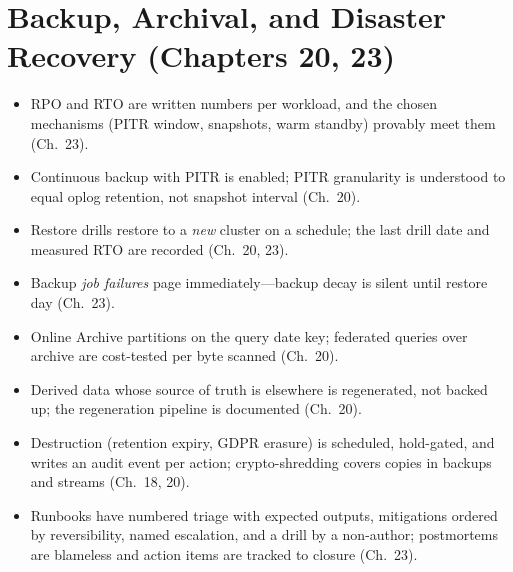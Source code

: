 \section{Backup, Archival, and Disaster Recovery (Chapters 20, 23)}
%
\begin{itemize}
    \item[$\square$] RPO and RTO are written numbers per workload, and the chosen mechanisms (PITR window, snapshots, warm standby) provably meet them (Ch.~23).
    \item[$\square$] Continuous backup with PITR is enabled; PITR granularity is understood to equal oplog retention, not snapshot interval (Ch.~20).
    \item[$\square$] Restore drills restore to a \emph{new} cluster on a schedule; the last drill date and measured RTO are recorded (Ch.~20, 23).
    \item[$\square$] Backup \emph{job failures} page immediately---backup decay is silent until restore day (Ch.~23).
    \item[$\square$] Online Archive partitions on the query date key; federated queries over archive are cost-tested per byte scanned (Ch.~20).
    \item[$\square$] Derived data whose source of truth is elsewhere is regenerated, not backed up; the regeneration pipeline is documented (Ch.~20).
    \item[$\square$] Destruction (retention expiry, GDPR erasure) is scheduled, hold-gated, and writes an audit event per action; crypto-shredding covers copies in backups and streams (Ch.~18, 20).
    \item[$\square$] Runbooks have numbered triage with expected outputs, mitigations ordered by reversibility, named escalation, and a drill by a non-author; postmortems are blameless and action items are tracked to closure (Ch.~23).
\end{itemize}

